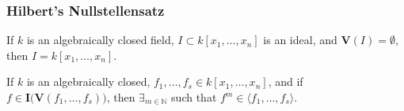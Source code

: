             \subsubsection{Hilbert's Nullstellensatz}
                \begin{theorem}
                    If $k$ is an algebraically closed field,
                    $I\subset k[x_1,\hdots ,x_n]$ is an ideal,
                    and $\mathbf{V}(I)=\emptyset$,
                    then $I=k[x_1,\hdots ,x_n]$.
                \end{theorem}
                \begin{theorem}
                    If $k$ is an algebraically closed,
                    $f_{1},\hdots,f_{s}\in k[x_{1},\hdots,x_{n}]$,
                    and if
                    $f\in\textbf{I}\big(\mathbf{V}(f_1,\hdots,f_s)\big)$,
                    then $\exists_{m\in\mathbb{N}}$ such that
                    $f^m \in \langle f_1,\hdots, f_s \rangle$.
                \end{theorem}
